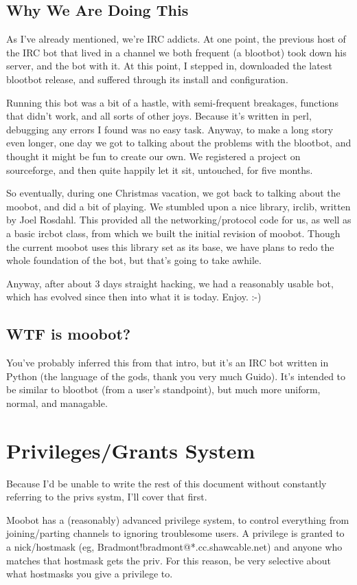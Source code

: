 \documentclass[titlepage]{article}
\begin{document}
		\subsection{Why We Are Doing This}
			As I've already mentioned, we're IRC addicts.  At one point, the previous host of the IRC bot that lived in a channel we both frequent (a blootbot) took down his server, and the bot with it.  At this point, I stepped in, downloaded the latest blootbot release, and suffered through its install and configuration.  
			
			Running this bot was a bit of a hastle, with semi-frequent breakages, functions that didn't work, and all sorts of other joys.  Because it's written in perl, debugging any errors I found was no easy task.  Anyway, to make a long story even longer, one day we got to talking about the problems with the blootbot, and thought it might be fun to create our own.  We registered a project on sourceforge, and then quite happily let it sit, untouched, for five months.

			So eventually, during one Christmas vacation, we got back to talking about the moobot, and did a bit of playing.  We stumbled upon a nice library, irclib, written by Joel Rosdahl.  This provided all the networking/protocol code for us, as well as a basic ircbot class, from which we built the initial revision of moobot.  Though the current moobot uses this library set as its base, we have plans to redo the whole foundation of the bot, but that's going to take awhile.

			Anyway, after about 3 days straight hacking, we had a reasonably usable bot, which has evolved since then into what it is today.  Enjoy. :-)
		\subsection{WTF is moobot?}
			You've probably inferred this from that intro, but it's an IRC bot written in Python (the language of the gods, thank you very much Guido).  It's intended to be similar to blootbot (from a user's standpoint), but much more uniform, normal, and managable.

	\section{Privileges/Grants System}
		Because I'd be unable to write the rest of this document without constantly referring to the privs systm, I'll cover that first.

		Moobot has a (reasonably) advanced privilege system, to control everything from joining/parting channels to ignoring troublesome users.  A privilege is granted to a nick/hostmask (eg, Bradmont!bradmont@*.cc.shawcable.net) and anyone who matches that hostmask gets the priv.  For this reason, be very selective about what hostmasks you give a privilege to.
\end{document}
